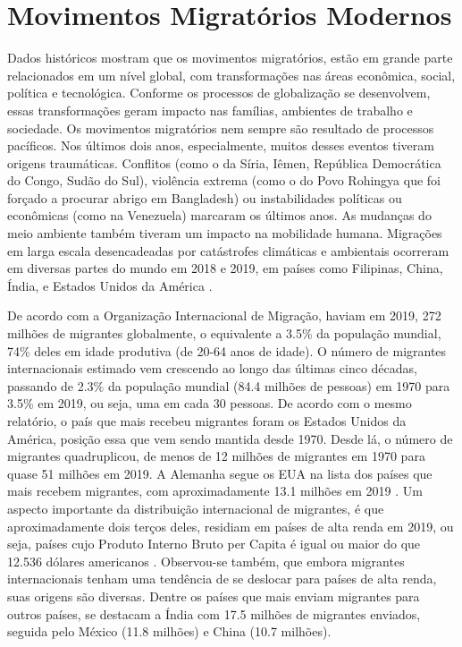 \documentclass[12pt]{abntex2}
\begin{document}
\section {Movimentos Migratórios Modernos}

Dados históricos mostram que os movimentos migratórios, estão em grande parte relacionados em um nível global, com transformações nas áreas econômica, social, política e tecnológica. Conforme os processos de globalização se desenvolvem, essas transformações geram impacto nas famílias, ambientes de trabalho e sociedade. Os movimentos migratórios nem sempre são resultado de processos pacíficos. Nos últimos dois anos, especialmente, muitos desses eventos tiveram origens traumáticas. Conflitos (como o da Síria, Iêmen, República Democrática do Congo, Sudão do Sul), violência extrema (como o do Povo Rohingya que foi forçado a procurar abrigo em Bangladesh) ou instabilidades políticas ou econômicas (como na Venezuela) marcaram os últimos anos. As mudanças do meio ambiente também tiveram um impacto na mobilidade humana. Migrações em larga escala desencadeadas por catástrofes climáticas e ambientais ocorreram em diversas partes do mundo em 2018 e 2019, em países como Filipinas, China, Índia, e Estados Unidos da América \cite[p. 19]{iom2020}.

De acordo com a Organização Internacional de Migração, haviam em 2019, 272 milhões de migrantes globalmente, o equivalente a 3.5\% da população mundial, 74\% deles em idade produtiva (de 20-64 anos de idade). O número de migrantes internacionais estimado vem crescendo ao longo das últimas cinco décadas, passando de 2.3\% da população mundial (84.4 milhões de pessoas) em 1970 para 3.5\% em 2019, ou seja, uma em cada 30 pessoas. De acordo com o mesmo relatório, o país que mais recebeu migrantes foram os Estados Unidos da América, posição essa que vem sendo mantida desde 1970. Desde lá, o número de migrantes quadruplicou, de menos de 12 milhões de migrantes em 1970 para quase 51 milhões em 2019. A Alemanha segue os EUA na lista dos países que mais recebem migrantes, com aproximadamente 13.1 milhões em 2019 \cite[p. 21]{iom2020}. Um aspecto importante da distribuição internacional de migrantes, é que aproximadamente dois terços deles, residiam em países de alta renda em 2019, ou seja, países cujo Produto Interno Bruto per Capita é igual ou maior do que 12.536 dólares americanos \cite{world_bank_country_lending_groups}. Observou-se também, que embora migrantes internacionais tenham uma tendência de se deslocar para países de alta renda, suas origens são diversas.  Dentre os países que mais enviam migrantes para outros países, se destacam a Índia com 17.5 milhões de migrantes enviados, seguida pelo México (11.8 milhões) e China (10.7 milhões). 
\end{document}
